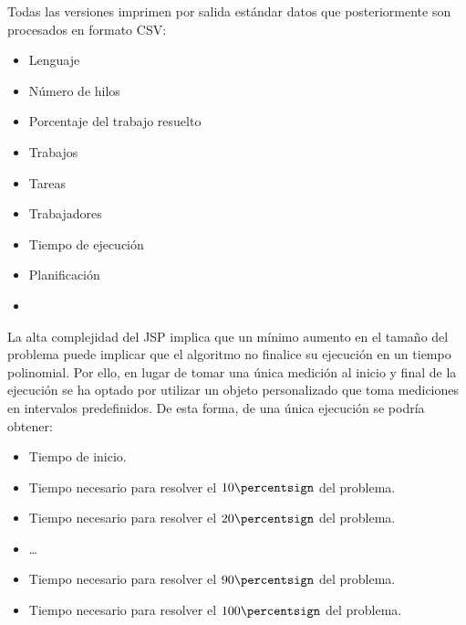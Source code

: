 Todas las versiones imprimen por salida estándar datos que posteriormente son
procesados en formato CSV:

\begin{itemize}[itemsep=0.25px]
    \item Lenguaje
    \item Número de hilos
    \item Porcentaje del trabajo resuelto
    \item Trabajos
    \item Tareas
    \item Trabajadores
    \item Tiempo de ejecución
    \item Planificación
    \item {}
\end{itemize}

La alta complejidad del JSP implica que un mínimo aumento en el tamaño del problema
puede implicar que el algoritmo no finalice su ejecución en un tiempo polinomial.
Por ello, en lugar de tomar una única medición al inicio y final de la ejecución
se ha optado por utilizar un objeto personalizado que toma mediciones en intervalos
predefinidos.
De esta forma, de una única ejecución se podría obtener:

\begin{itemize}[itemsep=0.25px]
    \item Tiempo de inicio.
    \item Tiempo necesario para resolver el $10\percentsign$ del problema.
    \item Tiempo necesario para resolver el $20\percentsign$ del problema.
    \item \dots
    \item Tiempo necesario para resolver el $90\percentsign$ del problema.
    \item Tiempo necesario para resolver el $100\percentsign$ del problema.
\end{itemize}

\pagebreak

